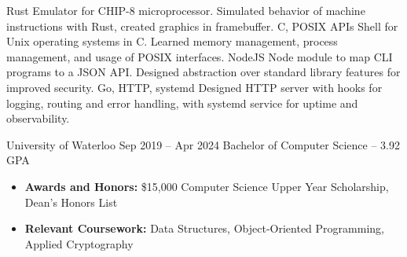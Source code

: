 \documentclass{article}
\begin{document}
\normalsize
{}
{Rust}
{Emulator for CHIP-8 microprocessor. Simulated behavior of machine instructions with
Rust, created graphics in framebuffer.}
\vspace{1.5mm}
{C, POSIX APIs}
{Shell for Unix operating systems in C. Learned memory management, process management,
and usage of POSIX interfaces. }
\vspace{1.5mm}
{NodeJS}
{Node module to map CLI programs to a JSON API. Designed abstraction over standard
library features for improved security.}
\vspace{1.5mm}
{Go, HTTP, systemd}
{Designed HTTP server with hooks for logging, routing and error handling, with systemd service for uptime and observability.}
\vspace{1mm}

\EducationEntry
{University of Waterloo}
{Sep 2019 -- Apr 2024}
{Bachelor of Computer Science -- 3.92 GPA}
{\begin{itemize} \itemsep -1pt
    \item {\bf Awards and Honors:} \$15,000 Computer Science Upper Year Scholarship, Dean's Honors List
    \item {\bf Relevant Coursework:} Data Structures, Object-Oriented Programming, Applied Cryptography
    \end{itemize}}
\vspace{-2mm}
\end{document}
